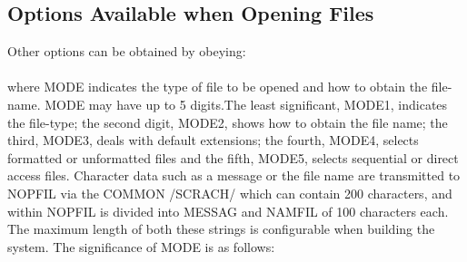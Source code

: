 \subsection{Options Available when Opening Files}
Other options can be obtained by obeying:\\[0.2ex]
\\[0.2ex]
where MODE indicates the type of file to be opened and how to obtain
the file-name.\p 
MODE may have up to 5 digits.The least significant, MODE1, indicates
the file-type; the second digit, MODE2, shows how to obtain the file
name; the third, MODE3, deals with default extensions; the fourth, MODE4,
selects formatted or unformatted files and the fifth, MODE5, selects
sequential or direct access files.\p
Character data such as a message or
the file name are transmitted to NOPFIL via the COMMON /SCRACH/ which
can contain 200 characters, and within NOPFIL is divided into MESSAG 
and NAMFIL of 100 characters each. The maximum length of both these
strings is configurable when building the system. \p
The significance of MODE is as follows:
